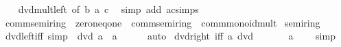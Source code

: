 \begin{isabellebody}
%
\isadelimproof
\ \ %
\endisadelimproof
%
\isatagproof
{}\isamarkupfalse%
\ dvd{\isacharunderscore}{\kern0pt}mult{\isacharunderscore}{\kern0pt}left\ {\isacharbrackleft}{\kern0pt}of\ b\ a\ c{\isacharbrackright}{\kern0pt}\ \isamarkupfalse%
\ {\isacharparenleft}{\kern0pt}simp\ add{\isacharcolon}{\kern0pt}\ ac{\isacharunderscore}{\kern0pt}simps{\isacharparenright}{\kern0pt}%
\endisatagproof
{\isafoldproof}%
%
\isadelimproof
\isanewline
%
\endisadelimproof
\isanewline
{}\isamarkupfalse%
\isanewline
\isanewline
{}\isamarkupfalse%
\ comm{\isacharunderscore}{\kern0pt}semiring{\isacharunderscore}{\kern0pt}{}\ {\isacharequal}{\kern0pt}\ zero{\isacharunderscore}{\kern0pt}neq{\isacharunderscore}{\kern0pt}one\ {\isacharplus}{\kern0pt}\ comm{\isacharunderscore}{\kern0pt}semiring{\isacharunderscore}{\kern0pt}{}\ {\isacharplus}{\kern0pt}\ comm{\isacharunderscore}{\kern0pt}monoid{\isacharunderscore}{\kern0pt}mult\isanewline
{}\isanewline
\isanewline
{}\isamarkupfalse%
\ semiring{\isacharunderscore}{\kern0pt}{}%
\isadelimproof
\ %
\endisadelimproof
%
\isatagproof
\isacommand{{\isachardot}{\kern0pt}{\isachardot}{\kern0pt}}\isamarkupfalse%
%
\endisatagproof
{\isafoldproof}%
%
\isadelimproof
%
\endisadelimproof
\isanewline
\isanewline
{}\isamarkupfalse%
\ dvd{\isacharunderscore}{\kern0pt}{}{\isacharunderscore}{\kern0pt}left{\isacharunderscore}{\kern0pt}iff\ {\isacharbrackleft}{\kern0pt}simp{\isacharbrackright}{\kern0pt}{\isacharcolon}{\kern0pt}\ {\isachardoublequoteopen}{}\ dvd\ a\ {\isasymlongleftrightarrow}\ a\ {\isacharequal}{\kern0pt}\ {}{\isachardoublequoteclose}\isanewline
%
\isadelimproof
\ \ %
\endisadelimproof
%
\isatagproof
{}\isamarkupfalse%
\ auto%
\endisatagproof
{\isafoldproof}%
%
\isadelimproof
\isanewline
%
\endisadelimproof
\isanewline
{}\isamarkupfalse%
\ dvd{\isacharunderscore}{\kern0pt}{}{\isacharunderscore}{\kern0pt}right\ {\isacharbrackleft}{\kern0pt}iff{\isacharbrackright}{\kern0pt}{\isacharcolon}{\kern0pt}\ {\isachardoublequoteopen}a\ dvd\ {}{\isachardoublequoteclose}\isanewline
%
\isadelimproof
%
\endisadelimproof
%
\isatagproof
{}\isamarkupfalse%
\isanewline
\ \ \isamarkupfalse%
\ {\isachardoublequoteopen}{}\ {\isacharequal}{\kern0pt}\ a\ {\isacharasterisk}{\kern0pt}\ {}{\isachardoublequoteclose}\ \isamarkupfalse%
\ simp\isanewline
{}\isamarkupfalse%

\end{isabellebody}
